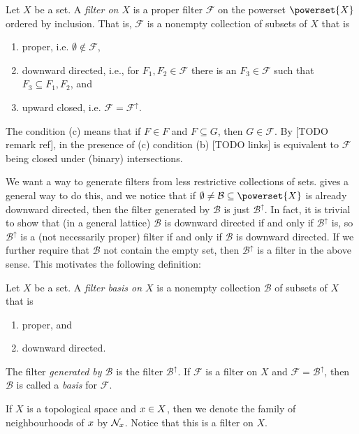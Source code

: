 \documentclass[article, a4paper, 11pt, oneside]{memoir}
\numberwithin{equation}{chapter}
\newcommand{\calB}{\mathcal{B}}
\newcommand{\calF}{\mathcal{F}}
\theoremstyle{nonumberplain}
\begin{document}
\begin{definition}[Filters]
    Let $X$ be a set. A \emph{filter on $X$} is a proper filter $\calF$ on the powerset $\powerset{X}$ ordered by inclusion. That is, $\calF$ is a nonempty collection of subsets of $X$ that is
    \begin{enumerate}
        \item proper, i.e. $\emptyset \not\in \calF$,
        \item downward directed, i.e., for $F_1, F_2 \in \calF$ there is an $F_3 \in \calF$ such that $F_3 \subseteq F_1, F_2$, and
        \item upward closed, i.e. $\calF = \calF^\uparrow$.
    \end{enumerate}
\end{definition}
%
The condition (c) means that if $F \in F$ and $F \subseteq G$, then $G \in \calF$. By [TODO remark ref], in the presence of (c) condition (b) [TODO links] is equivalent to $\calF$ being closed under (binary) intersections.

We want a way to generate filters from less restrictive collections of sets. \Textcite[Exercise~2.22]{daveypriestley2002} gives a general way to do this, and we notice that if $\emptyset \neq \calB \subseteq \powerset{X}$ is already downward directed, then the filter generated by $\calB$ is just $\calB^\uparrow$. In fact, it is trivial to show that (in a general lattice) $\calB$ is downward directed if and only if $\calB^\uparrow$ is, so $\calB^\uparrow$ is a (not necessarily proper) filter if and only if $\calB$ is downward directed. If we further require that $\calB$ not contain the empty set, then $\calB^\uparrow$ is a filter in the above sense. This motivates the following definition:

\begin{definition}
    Let $X$ be a set. A \emph{filter basis on $X$} is a nonempty collection $\calB$ of subsets of $X$ that is
    \begin{enumerate}
        \item proper, and
        \item downward directed.
    \end{enumerate}
    The filter \emph{generated by $\calB$} is the filter $\calB^\uparrow$. If $\calF$ is a filter on $X$ and $\calF = \calB^\uparrow$, then $\calB$ is called a \emph{basis} for $\calF$.
\end{definition}

If $X$ is a topological space and $x \in X$, then we denote the family of neighbourhoods of $x$ by $\mathcal{N}_{x}$. Notice that this is a filter on $X$.
\end{document}
